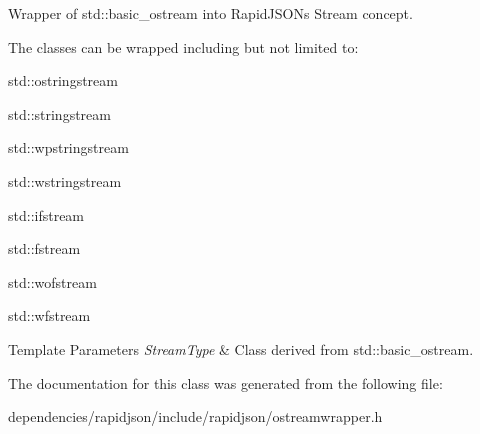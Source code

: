 Wrapper of {\ttfamily std\+::basic\+\_\+ostream} into Rapid\+J\+S\+ON\textquotesingle{}s Stream concept. 

The classes can be wrapped including but not limited to\+:


\begin{DoxyItemize}
\item {\ttfamily std\+::ostringstream} 
\item {\ttfamily std\+::stringstream} 
\item {\ttfamily std\+::wpstringstream} 
\item {\ttfamily std\+::wstringstream} 
\item {\ttfamily std\+::ifstream} 
\item {\ttfamily std\+::fstream} 
\item {\ttfamily std\+::wofstream} 
\item {\ttfamily std\+::wfstream} 
\end{DoxyItemize}


\begin{DoxyTemplParams}{Template Parameters}
{\em Stream\+Type} & Class derived from {\ttfamily std\+::basic\+\_\+ostream}. \\
\hline
\end{DoxyTemplParams}


The documentation for this class was generated from the following file\+:\begin{DoxyCompactItemize}
\item 
dependencies/rapidjson/include/rapidjson/ostreamwrapper.\+h\end{DoxyCompactItemize}

